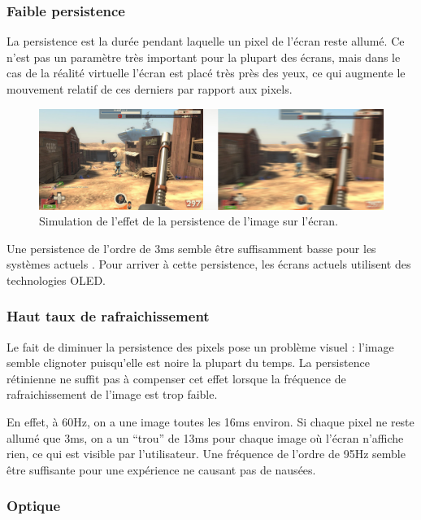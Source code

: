 \documentclass[a4,12pt]{scrartcl}
\begin{document}
\subsubsection{Faible persistence}

La persistence est la durée pendant laquelle un pixel de l'écran reste allumé. Ce n'est pas un paramètre très important pour la plupart des écrans, mais dans le cas de la réalité virtuelle l'écran est placé très près des yeux, ce qui augmente le mouvement relatif de ces derniers par rapport aux pixels.

\begin{figure}[H]
	\centering
	\includegraphics[width=\linewidth]{persistence}
	\caption{Simulation de l'effet de la persistence de l'image sur l'écran.}
\end{figure}

Une persistence de l'ordre de 3ms semble être suffisamment basse pour les systèmes actuels \cite{Abrash14}. Pour arriver à cette persistence, les écrans actuels utilisent des technologies OLED.

\subsubsection{Haut taux de rafraichissement}

Le fait de diminuer la persistence des pixels pose un problème visuel : l'image semble clignoter puisqu'elle est noire la plupart du temps. La persistence rétinienne ne suffit pas à compenser cet effet lorsque la fréquence de rafraichissement de l'image est trop faible.

En effet, à 60Hz, on a une image toutes les 16ms environ. Si chaque pixel ne reste allumé que 3ms, on a un “trou” de 13ms pour chaque image où l’écran n’affiche rien, ce qui est visible par l’utilisateur. Une fréquence de l’ordre de 95Hz semble être suffisante pour une expérience ne causant pas de nausées.


\subsubsection{Optique}
\end{document}
